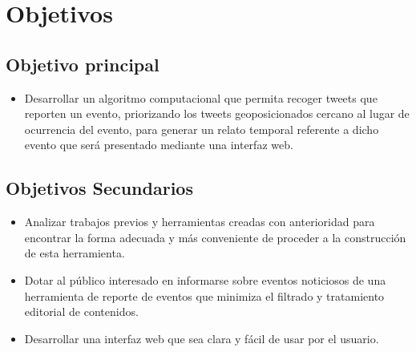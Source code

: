 \section{Objetivos}

\subsection{Objetivo principal}

\begin{itemize}
\item Desarrollar un algoritmo computacional que permita recoger tweets que reporten un evento, priorizando 
los tweets geoposicionados cercano al lugar de ocurrencia del evento, para generar un relato temporal
referente a dicho evento que será presentado mediante una interfaz web.
\end{itemize}

\subsection{Objetivos Secundarios}
\begin{itemize}
\item Analizar trabajos previos y herramientas creadas con anterioridad para encontrar la forma adecuada y más conveniente de proceder a la construcción de esta herramienta.
\item Dotar al público interesado en informarse sobre eventos noticiosos de una herramienta de reporte de eventos que minimiza el filtrado y tratamiento editorial de contenidos.
\item Desarrollar una interfaz web que sea clara y fácil de usar por el usuario.
\end{itemize}
